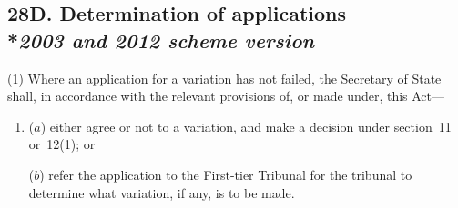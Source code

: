 \documentclass[12pt,a4paper]{article}
\begin{document}

\subsection[28D. Determination of applications --- \emph{2003 and 2012 scheme version}]{28D. Determination of applications\\*\emph{2003 and 2012 scheme version}}

%

(1) Where an application for a variation has not failed, the 
Secretary of State  %
shall, in accordance with the relevant provisions of, or made under, this Act—
\begin{enumerate}\item[]
($a$) either agree or not to a variation, and make a decision under section~11 or~12(1); or

($b$) refer the application to 
the First-tier Tribunal  %
for the tribunal to determine what variation, if any, is to be made.
\end{enumerate}
\end{document}

